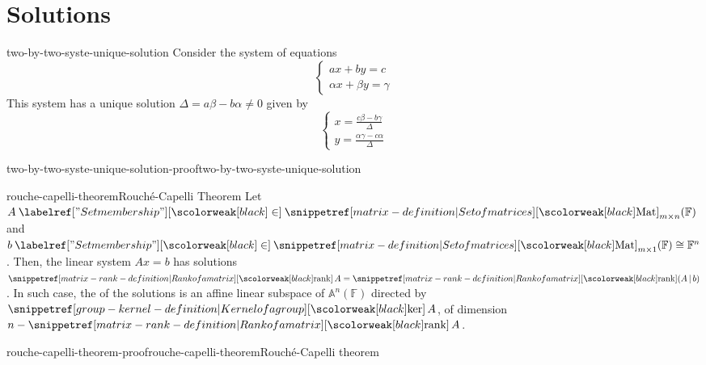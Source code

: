 \documentclass[preview]{standalone}
\begin{document}
\section{Solutions}

\begin{snippetproposition}{two-by-two-syste-unique-solution}{}
    Consider the system of equations
    \[
        \begin{cases}
            ax + by = c \\
            \alpha x + \beta y = \gamma
        \end{cases}
    \]
    This system has a unique solution \ifandonlyif \(\Delta = a\beta - b\alpha \neq 0\)
    given by
    \[
        \begin{cases}
            x = \frac{c\beta - b\gamma}{\Delta} \\
            y = \frac{\alpha\gamma - c\alpha}{\Delta}
        \end{cases}
    \]
\end{snippetproposition}

\begin{snippetproof}{two-by-two-syste-unique-solution-proof}{two-by-two-syste-unique-solution}{}
\end{snippetproof}

\begin{snippettheorem}{rouche-capelli-theorem}{Rouché-Capelli Theorem}
    Let \(A \in \matrices_{m\times n}(\mathbb{F})\) and \(b\in \matrices_{m\times 1}(\mathbb{F}) \cong \mathbb{F}^n\). %
    Then, the linear system \(Ax = b\) has solutions \ifandonlyif \(\mrank A = \mrank (A \,|\, b)\).
    In such case, the \vectorspace of the solutions is an affine linear subspace of \(\mathbb{A}^n(\mathbb{F})\)
    directed by \(\grpker A\), of dimension \(n - \mrank A\).
\end{snippettheorem}

\begin{snippetproof}{rouche-capelli-theorem-proof}{rouche-capelli-theorem}{Rouché-Capelli theorem}
    \todo
\end{snippetproof}
\end{document}
